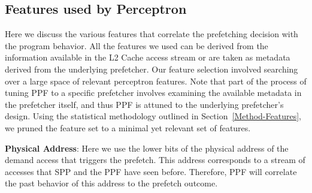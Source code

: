 
\subsection{Features used by Perceptron}
\label{Impl-Features}
Here we discuss the various features that correlate the prefetching
decision with the program behavior.  All the features we used can be
derived from the information available in the L2 Cache access stream
or are taken as metadata derived from the {\color{red}underlying} prefetcher.  Our
feature selection involved searching over a large space of relevant
perceptron features.  Note that part of the process of tuning PPF to a
specific prefetcher involves examining the available metadata in the
prefetcher itself, and thus PPF is attuned to the {\color{red}underlying}
prefetcher's design. Using the statistical methodology outlined in
Section~\ref{Method-Features}, we pruned the feature set to a minimal
yet relevant set of features.
%

\noindent \textbf{Physical Address}: Here we use the lower bits 
of the physical address of 
the demand access that triggers the prefetch. This address corresponds 
to a  stream of accesses that SPP and the PPF have seen before. 
Therefore, PPF will correlate the past behavior of this address 
to the prefetch outcome. 
%

